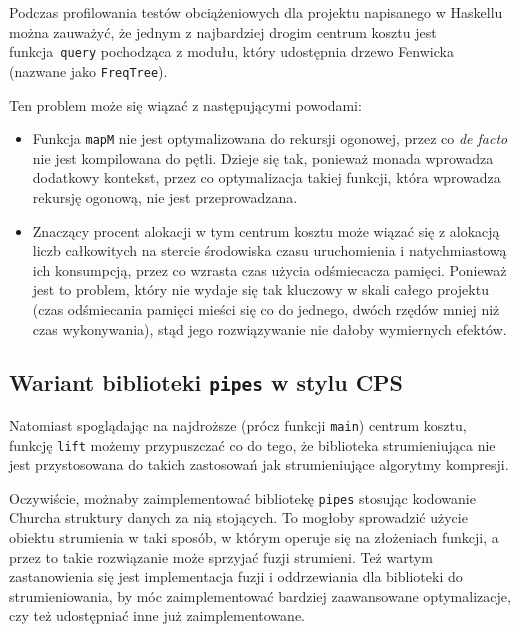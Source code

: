 \documentclass[../../thesis.tex]{subfiles}
\begin{document}
Podczas profilowania testów obciążeniowych dla projektu napisanego w Haskellu
można zauważyć, że jednym z najbardziej drogim centrum kosztu jest
funkcja~\texttt{query} pochodząca z modułu, który udostępnia
drzewo Fenwicka (nazwane jako \texttt{FreqTree}). 

Ten problem może się wiązać z następującymi powodami:
\begin{itemize}
  \item Funkcja \texttt{mapM} nie jest optymalizowana do rekursji ogonowej,
    przez co \emph{de facto} nie jest kompilowana do pętli. Dzieje się tak,
    ponieważ monada wprowadza dodatkowy kontekst, przez co optymalizacja
    takiej funkcji, która wprowadza rekursję ogonową, nie jest przeprowadzana.
  \item Znaczący procent alokacji w tym centrum kosztu może wiązać się z
    alokacją liczb całkowitych na stercie środowiska czasu uruchomienia
    i natychmiastową ich konsumpcją, przez co wzrasta czas użycia odśmiecacza
    pamięci. Ponieważ jest to problem, który nie wydaje się tak kluczowy
    w skali całego projektu (czas odśmiecania pamięci mieści się co do
    jednego, dwóch rzędów mniej niż czas wykonywania), stąd jego rozwiązywanie
    nie dałoby wymiernych efektów.
\end{itemize}

\subsection{Wariant biblioteki \texttt{pipes} w stylu CPS}

Natomiast spoglądając na najdroższe (prócz funkcji \texttt{main}) centrum kosztu,
funkcję \texttt{lift} możemy przypuszczać co do tego, że biblioteka strumieniująca
nie jest przystosowana do takich zastosowań jak strumieniujące algorytmy
kompresji.

Oczywiście, możnaby zaimplementować bibliotekę \texttt{pipes}
stosując kodowanie Churcha struktury danych za nią stojących.
To mogłoby sprowadzić użycie obiektu strumienia w taki sposób, w którym
operuje się na złożeniach funkcji, a przez to takie rozwiązanie może sprzyjać
fuzji strumieni.
Też wartym zastanowienia się jest implementacja fuzji i oddrzewiania
dla biblioteki do strumieniowania, by móc zaimplementować bardziej
zaawansowane optymalizacje, czy też udostępniać inne już zaimplementowane.
\end{document}
